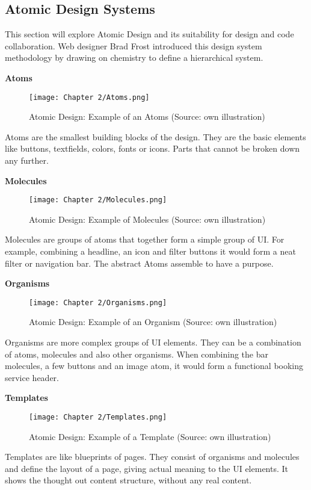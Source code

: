 \newpage
\subsection{Atomic Design Systems} \label{Atomic Design Systems}
This section will explore Atomic Design and its suitability for design and code collaboration. Web
designer Brad Frost introduced this design system methodology by drawing on chemistry to define a
hierarchical system.

\textbf{Atoms} \\
\begin{figure}[H]
	\centering
    \texttt{[image: Chapter 2/Atoms.png]}
    \caption{Atomic Design: Example of an Atoms (Source: own illustration)}
\end{figure}
Atoms are the smallest building blocks of the design. They are the basic elements like buttons,
textfields, colors, fonts or icons. Parts that cannot be broken down any further.

\textbf{Molecules} \\
\begin{figure}[H]
	\centering
    \texttt{[image: Chapter 2/Molecules.png]}
    \caption{Atomic Design: Example of Molecules (Source: own illustration)}
\end{figure}
Molecules are groups of atoms that together form a simple group of UI. For example, combining
a headline, an icon and filter buttons it would form a neat filter or navigation bar. The
abstract Atoms assemble to have a purpose.

\textbf{Organisms} \\
\begin{figure}[H]
	\centering
    \texttt{[image: Chapter 2/Organisms.png]}
    \caption{Atomic Design: Example of an Organism (Source: own illustration)}
\end{figure}
Organisms are more complex groups of UI elements. They can be a combination of atoms, molecules and
also other organisms. When combining the bar molecules, a few buttons and an image atom, it would
form a functional booking service header.

\textbf{Templates} \\
\begin{figure}[H]
	\centering
    \texttt{[image: Chapter 2/Templates.png]}
    \caption{Atomic Design: Example of a Template (Source: own illustration)}
\end{figure}
Templates are like blueprints of pages. They consist of organisms and molecules and define the
layout of a page, giving actual meaning to the UI elements. It shows the thought out content
structure, without any real content.

